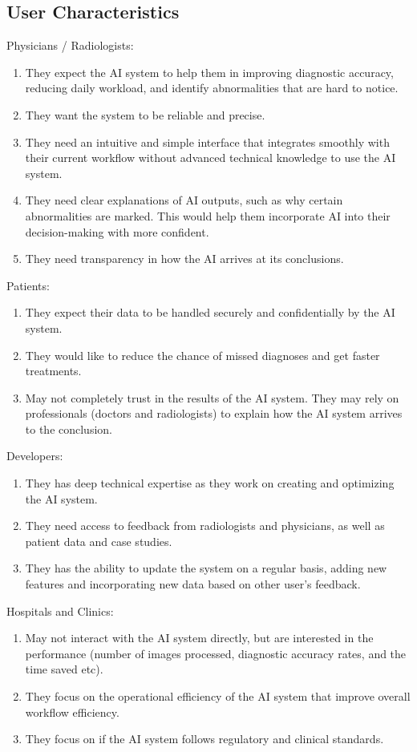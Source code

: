 \documentclass[12pt]{article}
\begin{document}
\subsection{User Characteristics} \label{SecUserCharacteristics}
Physicians / Radiologists: 
\begin{enumerate}
 \item They expect the AI system to help them in improving diagnostic accuracy, reducing daily workload, and identify abnormalities that are hard to notice.
 \item They want the system to be reliable and precise.
 \item They need an intuitive and simple interface that integrates smoothly with their current workflow without advanced technical knowledge to use the AI system.
 \item They need clear explanations of AI outputs, such as why certain abnormalities are marked. This would help them incorporate AI into their decision-making with more confident.
 \item They need transparency in how the AI arrives at its conclusions.
 \end{enumerate}
 Patients:
 \begin{enumerate}
 \item They expect their data to be handled securely and confidentially by the AI system.
 \item They would like to reduce the chance of missed diagnoses and get faster treatments.
 \item May not completely trust in the results of the AI system. They may rely on professionals (doctors and radiologists) to explain how the AI system arrives to the conclusion.
 \end{enumerate}
Developers:
 \begin{enumerate}
 \item They has deep technical expertise as they work on creating and optimizing the AI system.
 \item They need access to feedback from radiologists and physicians, as well as patient data and case studies. 
 \item They has the ability to update the system on a regular basis, adding new features and incorporating new data based on other user's feedback.
 \end{enumerate}
Hospitals and Clinics:
 \begin{enumerate}
 \item May not interact with the AI system directly, but are interested in the performance (number of images processed, diagnostic accuracy rates, and the time saved etc). 
 \item They focus on the operational efficiency of the AI system that improve overall workflow efficiency.
 \item They focus on if the AI system follows regulatory and clinical standards. 
 \end{enumerate}
\end{document}

